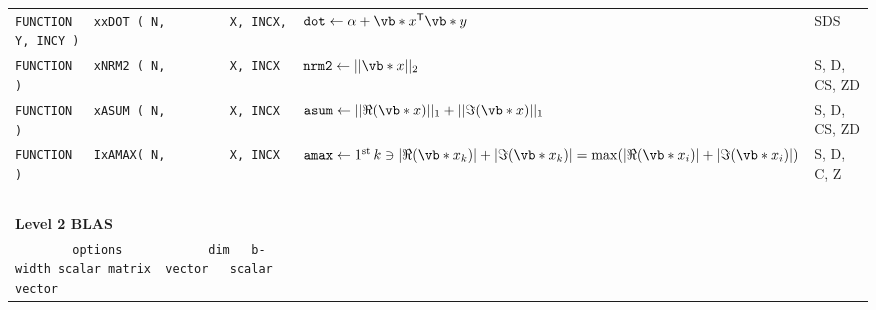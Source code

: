 \documentclass[10pt,a3paper, landscape]{article}
\newcommand{\T}{\mathsf{T}}
\begin{document}
\begin{tabular}{lll}
		\verb|FUNCTION   xxDOT ( N,         X, INCX, Y, INCY )                                         | & $\texttt{dot} \gets \alpha + \vb*{x}^{\T} \vb*{y}$                                                                                                                                                                                                           & SDS                \\
		\verb|FUNCTION   xNRM2 ( N,         X, INCX )                                                  | & $\texttt{nrm2} \gets ||\vb*{x}||_2$                                                                                                                                                                                                                          & S, D, CS, ZD       \\
		\verb|FUNCTION   xASUM ( N,         X, INCX )                                                  | & $\texttt{asum} \gets ||\Re(\vb*{x})||_1 + ||\Im(\vb*{x})||_1$                                                                                                                                                                                                & S, D, CS, ZD       \\
		\verb|FUNCTION   IxAMAX( N,         X, INCX )                                                  | & $\texttt{amax} \gets \text{1\textsuperscript{st}\,} k \ni |\Re(\vb*{x}_k)| + |\Im(\vb*{x}_k)| = \max(|\Re(\vb*{x}_i)| + |\Im(\vb*{x}_i)|) $                                                                                                                  & S, D, C, Z         \\
		\verb|                                                                                         | &                                                                                                                                                                                                                                                              &                    \\
		\multicolumn{3}{l}{\Large{\textbf{Level 2 BLAS}}}                                                                                                                                                                                                                                                                                                                                   \\
		\verb|        options            dim   b-width scalar matrix  vector   scalar vector           | &                                                                                                                                                                                                                                                              &                    \\

\end{tabular}
\end{document}
